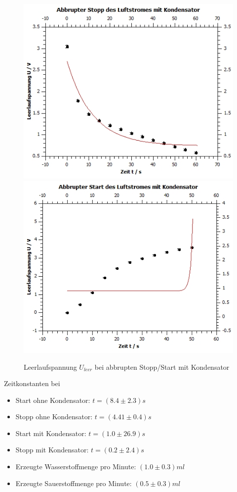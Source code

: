 \documentclass[12pt,a4paper,twoside]{article}
\begin{document}
\begin{figure}[H]
    \centering
    \includegraphics[width=0.6\linewidth]{nudes/wind kondensator stopp.jpg}
    \includegraphics[width=0.6\linewidth]{nudes/wind kondensator start.jpg}
    \caption{Leerlaufspannung $U_{leer}$ bei abbrupten Stopp/Start mit Kondensator}
    \label{fig:zusammenfassung Windkraft stopp start mit}
\end{figure}

Zeitkonstanten bei 

\begin{itemize}
    \item Start ohne Kondensator: $t = (8.4 \pm 2.3)s$
    \item Stopp ohne Kondensator: $t = (4.41 \pm 0.4)s$
    \item Start mit Kondensator: $t = (1.0 \pm 26.9)s$
    \item Stopp mit Kondensator: $t = (0.2 \pm 2.4)s$
\end{itemize}

\begin{itemize}
    \item Erzeugte Wasserstoffmenge pro Minute: $(1.0 \pm 0.3)ml$
    \item Erzeugte Sauerstoffmenge pro Minute: $(0.5 \pm 0.3)ml$
\end{itemize}

\printbibliography[heading=bibintoc]
\end{document}
